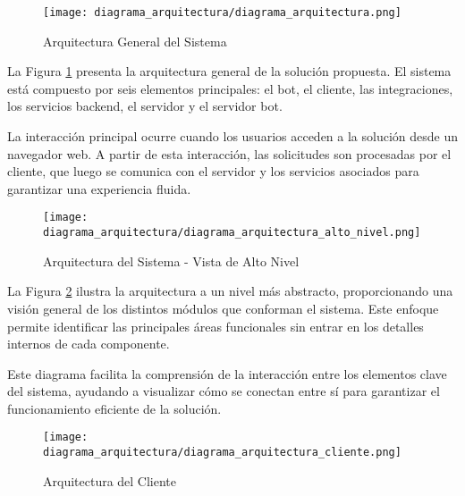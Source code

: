 
\begin{figure}[htbp]
    \centering
    \texttt{[image: diagrama\_arquitectura/diagrama\_arquitectura.png]}
    \caption{Arquitectura General del Sistema}
    \label{fig:diagrama_arquitectura}
\end{figure}

La Figura \ref{fig:diagrama_arquitectura} presenta la arquitectura general de la
solución propuesta. El sistema está compuesto por seis elementos principales: el
bot, el cliente, las integraciones, los servicios backend, el servidor y el
servidor bot. 

La interacción principal ocurre cuando los usuarios acceden a la solución
desde un navegador web. A partir de esta interacción, las solicitudes son
procesadas por el cliente, que luego se comunica con el servidor y los servicios
asociados para garantizar una experiencia fluida.

\begin{figure}[htbp]
    \centering
    \texttt{[image: diagrama\_arquitectura/diagrama\_arquitectura\_alto\_nivel.png]}
    \caption{Arquitectura del Sistema - Vista de Alto Nivel}
    \label{fig:diagrama_arquitectura_alto_nivel}
\end{figure}

La Figura \ref{fig:diagrama_arquitectura_alto_nivel} ilustra la arquitectura a
un nivel más abstracto, proporcionando una visión general de los distintos
módulos que conforman el sistema. Este enfoque permite identificar las
principales áreas funcionales sin entrar en los detalles internos de cada
componente. 

Este diagrama facilita la comprensión de la interacción entre los elementos
clave del sistema, ayudando a visualizar cómo se conectan entre sí para
garantizar el funcionamiento eficiente de la solución.

\begin{figure}[htbp]
    \centering
    \texttt{[image: diagrama\_arquitectura/diagrama\_arquitectura\_cliente.png]}
    \caption{Arquitectura del Cliente}
    \label{fig:diagrama_arquitectura_cliente}
\end{figure}

